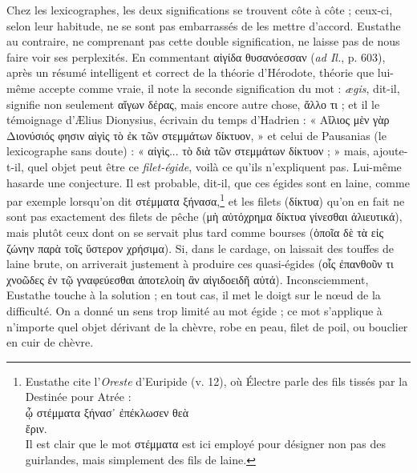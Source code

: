 \documentclass[a4paper, 11pt, oneside, polutonikogreek, french]{article}
\begin{document}
Chez les lexicographes, les deux significations se trouvent côte à côte ; ceux-ci, selon leur habitude, ne se sont pas embarrassés de les mettre d'accord. Eustathe au contraire, ne comprenant pas cette double signification, ne laisse pas de nous faire voir ses perplexités. En commentant αἰγίδα θυσανόεσσαν (\emph{ad Il.}, p. 603), après un résumé intelligent et correct de la théorie d'Hérodote, théorie que lui-même accepte comme vraie, il note la seconde signification du mot : \emph{ægis}, dit-il, signifie non seulement αἴγων δέρας, mais encore autre chose, ἄλλο τι ; et il le témoignage d'Ælius Dionysius, écrivain du temps d'Hadrien : « Αἴλιος μὲν γὰρ Διονύσιός φησιν αἰγὶς τὸ ἐκ τῶν στεμμάτων δίκτυον, » et celui de Pausanias (le lexicographe sans doute) : « αἰγὶς... τὸ διὰ τῶν στεμμάτων δίκτυον ; » mais, ajoute-t-il, quel objet peut être ce \emph{filet-égide}, voilà ce qu'ils n'expliquent pas. Lui-même hasarde une conjecture. Il est probable, dit-il, que ces égides sont en laine, comme par exemple lorsqu'on dit στέμματα ξήνασα,\footnote{Eustathe cite l'\emph{Oreste} d'Euripide (v. 12), où Électre parle des fils tissés par la Destinée pour Atrée :\\\hspace*{10mm}ᾦ στέμματα ξήνασ᾽ ἐπέκλωσεν θεὰ\\\hspace*{10mm}ἔριν.\\\hspace*{10mm}Il est clair que le mot στέμματα est ici employé pour désigner non pas des guirlandes, mais simplement des fils de laine.} et les filets (δίκτυα) qu'on en fait ne sont pas exactement des filets de pêche (μὴ αὐτόχρημα δίκτυα γίνεσθαι ἁλιευτικά), mais plutôt ceux dont on se servait plus tard comme bourses (ὁποῖα δὲ τὰ εἰς ζώνην παρὰ τοῖς ὕστερον χρήσιμα). Si, dans le cardage, on laissait des touffes de laine brute, on arriverait justement à produire ces quasi-égides (οἷς ἐπανθοῦν τι χνοῶδες ἐν τῷ γναφεύεσθαι ἀποτελοίη ἂν αἰγιδοειδῆ αὐτά). Inconsciemment, Eustathe touche à la solution ; en tout cas, il met le doigt sur le nœud de la difficulté. On a donné un sens trop limité au mot égide ; ce mot s'applique à n'importe quel objet dérivant de la chèvre, robe en peau, filet de poil, ou bouclier en cuir de chèvre.
\end{document}
